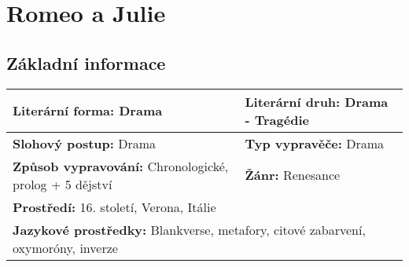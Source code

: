 \section{Romeo a Julie}
\subsection*{Základní informace}
\begin{tabularx}{\linewidth}{l|l}
    \textbf{Literární forma:} Drama                                & \textbf{Literární druh:} Drama - Tragédie   \\
    \hline
    \textbf{Slohový postup:} Drama                                 & \textbf{Typ vypravěče:} Drama               \\
    \hline
    \textbf{Způsob vypravování:} Chronologické, prolog + 5 dějství & \textbf{Žánr:} Renesance                    \\
    \hline
    \multicolumn{2}{l}{\textbf{Prostředí:} 16. století, Verona, Itálie}                                          \\
    \hline
    \multicolumn{2}{l}{\textbf{Jazykové prostředky:} Blankverse, metafory, citové zabarvení, oxymoróny, inverze} \\
\end{tabularx}
